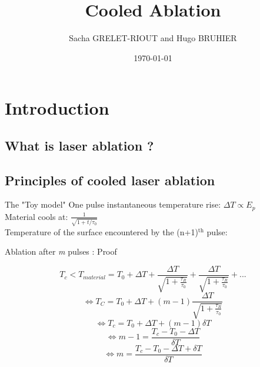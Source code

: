 \documentclass[11pt]{beamer}
\author{Sacha GRELET-RIOUT and Hugo BRUHIER}
\title{Cooled Ablation}
\institute{Télécom Saint-Étienne}
\date{\today}
\begin{document}

\begin{frame}
\titlepage
\end{frame}

\begin{frame}
\tableofcontents
\end{frame}

\section{Introduction}
\subsection{What is laser ablation ?}
\begin{frame}{}

\end{frame}

\subsection{Principles of cooled laser ablation}
\begin{frame}{The "Toy model"}
One pulse instantaneous temperature rise:
$
\Delta T \propto E_p
$
\\
\vspace{15px}
Material cools at:
$
\frac{1}{\sqrt{1+t/\tau_0}}
$
\\
\vspace{15px}
Temperature of the surface encountered by the (n+1)$^\text{th}$ pulse:

\end{frame}

\begin{frame}{Ablation after \emph{m} pulses : Proof}

$$
T_c < T_{material} = T_0 + \Delta T + \frac{\Delta T}{\sqrt{1+\frac{\tau_R}{\tau_0}}} + \frac{\Delta T}{\sqrt{1+\frac{\tau_R}{\tau_0}}} + ...
$$
$$
\Leftrightarrow T_C = T_0 + \Delta T + (m-1) \frac{\Delta T}{\sqrt{1+\frac{\tau_R}{\tau_0}}}
$$
$$
\Leftrightarrow T_c = T_0 + \Delta T + (m-1) \delta T
$$
$$
\Leftrightarrow m-1 = \frac{T_c - T_0 - \Delta T}{\delta T}
$$
\begin{equation}
\Leftrightarrow \boxed{m = \frac{T_c - T_0 - \Delta T + \delta T}{\delta T}}
\end{equation}


\end{frame}
\end{document}
